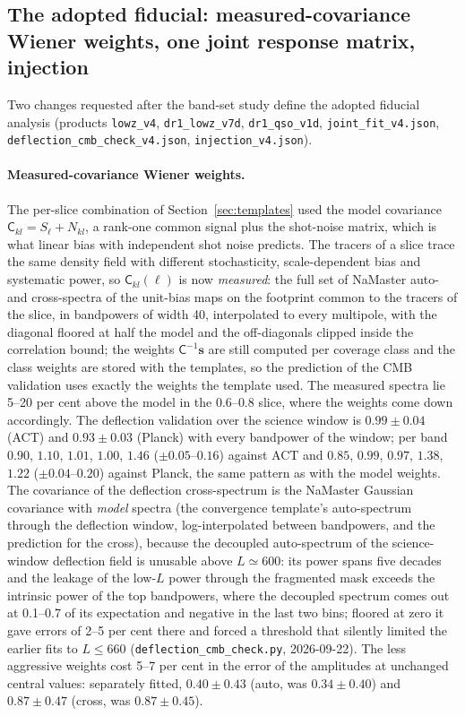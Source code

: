 \documentclass[11pt,a4paper]{article}
\begin{document}
\subsection{The adopted fiducial: measured-covariance Wiener weights, one joint response matrix, injection}
\label{sec:fiducial}
Two changes requested after the band-set study define the adopted fiducial analysis (products \texttt{lowz\_v4}, \texttt{dr1\_lowz\_v7d}, \texttt{dr1\_qso\_v1d}, \texttt{joint\_fit\_v4.json}, \texttt{deflection\_cmb\_check\_v4.json}, \texttt{injection\_v4.json}).

\paragraph{Measured-covariance Wiener weights.} The per-slice combination of Section~\ref{sec:templates} used the model covariance $\mathsf C_{kl}=S_\ell+N_{kl}$, a rank-one common signal plus the shot-noise matrix, which is what linear bias with independent shot noise predicts. The tracers of a slice trace the same density field with different stochasticity, scale-dependent bias and systematic power, so $\mathsf C_{kl}(\ell)$ is now \emph{measured}: the full set of NaMaster auto- and cross-spectra of the unit-bias maps on the footprint common to the tracers of the slice, in bandpowers of width 40, interpolated to every multipole, with the diagonal floored at half the model and the off-diagonals clipped inside the correlation bound; the weights $\mathsf C^{-1}\bm s$ are still computed per coverage class and the class weights are stored with the templates, so the prediction of the CMB validation uses exactly the weights the template used. The measured spectra lie 5--20 per cent above the model in the $0.6$--$0.8$ slice, where the weights come down accordingly. The deflection validation over the science window is $0.99\pm0.04$ (ACT) and $0.93\pm0.03$ (Planck) with every bandpower of the window; per band $0.90$, $1.10$, $1.01$, $1.00$, $1.46$ ($\pm0.05$--$0.16$) against ACT and $0.85$, $0.99$, $0.97$, $1.38$, $1.22$ ($\pm0.04$--$0.20$) against Planck, the same pattern as with the model weights. The covariance of the deflection cross-spectrum is the NaMaster Gaussian covariance with \emph{model} spectra (the convergence template's auto-spectrum through the deflection window, log-interpolated between bandpowers, and the prediction for the cross), because the decoupled auto-spectrum of the science-window deflection field is unusable above $L\simeq600$: its power spans five decades and the leakage of the low-$L$ power through the fragmented mask exceeds the intrinsic power of the top bandpowers, where the decoupled spectrum comes out at 0.1--0.7 of its expectation and negative in the last two bins; floored at zero it gave errors of 2--5 per cent there and forced a threshold that silently limited the earlier fits to $L\le660$ (\texttt{deflection\_cmb\_check.py}, 2026-09-22). The less aggressive weights cost 5--7 per cent in the error of the amplitudes at unchanged central values: separately fitted, $0.40\pm0.43$ (auto, was $0.34\pm0.40$) and $0.87\pm0.47$ (cross, was $0.87\pm0.45$).
\end{document}
